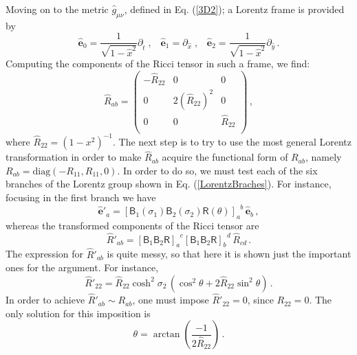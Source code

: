 \documentclass[twocolumn,prd,aps,showpacs,showkeys,amsmath,amssymb]{revtex4-1}
\newcommand{\bl}{\boldsymbol}
\begin{document}
Moving on to the metric $\hat{g}_{\mu\nu}$, defined in Eq. (\ref{3D2}); a Lorentz frame is provided by
\begin{equation*}
  \hat{\bl{e}}_0 = \frac{1}{\sqrt{1-  \hat{x}^2} } \partial_{\hat{t}} \;,\;\;\;
  \hat{\bl{e}}_1 =     \partial_{\hat{x}} \;,\;\;\;
  \hat{\bl{e}}_2 = \frac{1}{\sqrt{1-  \hat{x}^2} } \partial_{\hat{y}} \,.
\end{equation*}
Computing the components of the Ricci tensor in such a frame, we find:
\begin{equation*}
 \hat{R}_{ab} = \left(
             \begin{array}{ccc}
               -\hat{R}_{22} & 0 & 0 \\
               0 & 2(\hat{R}_{22})^2 &0 \\
               0 & 0 & \hat{R}_{22}\\
             \end{array}
           \right)\,,
\end{equation*}
where $\hat{R}_{22} = (1-x^2)^{-1}$. The next step is to try to use the most general Lorentz transformation in order to make $\hat{R}_{ab}$ acquire the functional form of $R_{ab}$, namely $R_{ab} = \textrm{diag}(-R_{11},R_{11},0)$. In order to do so, we must test each of the six branches of the Lorentz group shown in Eq. (\ref{LorentzBraches}). For instance, focusing in the first branch we have
\begin{equation*}
  \hat{\bl{e}}'_a = [\textsf{B}_1(\sigma_1) \textsf{B}_2(\sigma_2) \textsf{R}(\theta)]_a^{\;\;b}\, \hat{\bl{e}}_b \,,
\end{equation*}
whereas the transformed components of the Ricci tensor are
\begin{equation*}
 \hat{R}'_{ab} = [\textsf{B}_1  \textsf{B}_2  \textsf{R} ]_a^{\;\;c} [\textsf{B}_1  \textsf{B}_2  \textsf{R} ]_b^{\;\;d}\,\hat{R}_{cd}\,.
\end{equation*}
The expression for $\hat{R}'_{ab}$ is quite messy, so that here it is shown just the important ones for the argument. For instance,
\begin{equation*}
  \hat{R}'_{22} = \hat{R}_{22} \cosh^2\sigma_2 \,(\cos^2\theta + 2 \hat{R}_{22} \sin^2\theta) \,.
\end{equation*}
In order to achieve $\hat{R}'_{ab} \sim R_{ab}$, one must impose $\hat{R}'_{22}=0$, since $R_{22}=0$. The only solution for this imposition is
\begin{equation}\label{tetahat}
  \theta = \arctan\left( \frac{-1}{2\hat{R}_{22}}\right) \,.
\end{equation}
\end{document}
